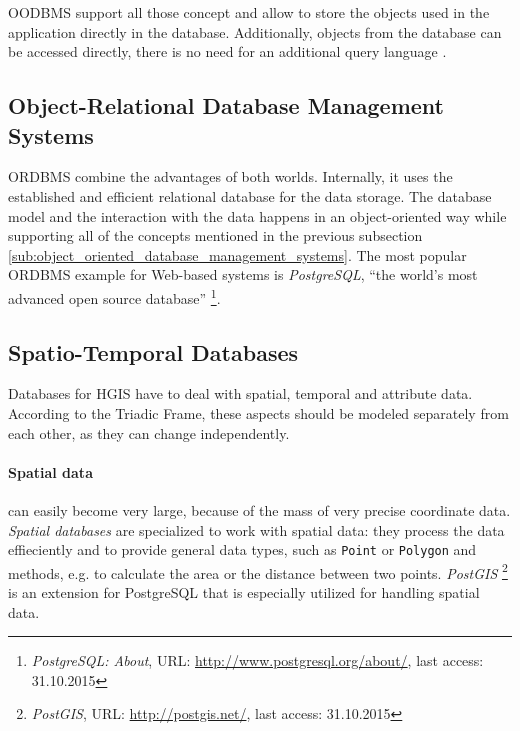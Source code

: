 OODBMS support all those concept and allow to store the objects used in the application directly in the database. Additionally, objects from the database can be accessed directly, there is no need for an additional query language \cite{oodbms}.


\subsection{Object-Relational Database Management Systems} %
\label{sub:object_relational_database_management_systems}

ORDBMS combine the advantages of both worlds. Internally, it uses the established and efficient relational database for the data storage. The database model and the interaction with the data happens in an object-oriented way while supporting all of the concepts mentioned in the previous subsection \ref{sub:object_oriented_database_management_systems}. The most popular ORDBMS example for Web-based systems is \emph{PostgreSQL}, ``the world's most advanced open source database''
\footnote{
  \emph{PostgreSQL: About},
  URL: \url{http://www.postgresql.org/about/},
  last access: 31.10.2015
}.


\subsection{Spatio-Temporal Databases} %
\label{par:spatial_databases}

Databases for HGIS have to deal with spatial, temporal and attribute data. According to the Triadic Frame, these aspects should be modeled separately from each other, as they can change independently.

\paragraph{Spatial data} %
\label{par:spatial_data}

can easily become very large, because of the mass of very precise coordinate data. \emph{Spatial databases} are specialized to work with spatial data: they process the data effieciently and to provide general data types, such as \texttt{Point} or \texttt{Polygon} and methods, e.g. to calculate the area or the distance between two points. \emph{PostGIS}
\footnote{
  \emph{PostGIS},
  URL: \url{http://postgis.net/},
  last access: 31.10.2015
}
is an extension for PostgreSQL that is especially utilized for handling spatial data.

